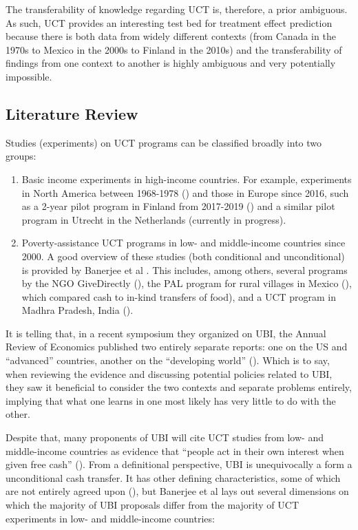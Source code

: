 \documentclass[a4paper,12pt]{article}
\begin{document}
The transferability of knowledge regarding UCT is, therefore, a prior ambiguous. As such, UCT provides an interesting test bed for treatment effect prediction because there is both data from widely different contexts (from Canada in the 1970s to Mexico in the 2000s to Finland in the 2010s) and the transferability of findings from one context to another is highly ambiguous and very potentially impossible.

\subsection{ Literature Review }

Studies (experiments) on UCT programs can be classified broadly into two groups:

\begin{enumerate}
\item Basic income experiments in high-income countries. For example, experiments in North America between 1968-1978 (\cite{Forget2011}) and those in Europe since 2016, such as a 2-year pilot program in Finland from 2017-2019 (\cite{Kangas2019}) and a similar pilot program in Utrecht in the Netherlands (currently in progress).

\item Poverty-assistance UCT programs in low- and middle-income countries since 2000. A good overview of these studies (both conditional and unconditional) is provided by Banerjee et al \parencite*{Banerjee2017}. This includes, among others, several programs by the NGO GiveDirectly (\cite{Blattman2016}), the PAL program for rural villages in Mexico (\cite{Cunha2019}), which compared cash to in-kind transfers of food), and a UCT program in Madhra Pradesh, India (\cite{bharat2014little}).

\end{enumerate}

It is telling that, in a recent symposium they organized on UBI, the Annual Review of Economics published two entirely separate reports: one on the US and ``advanced'' countries, another on the ``developing world'' (\cite{Hoynes2019, Banerjee2019}). Which is to say, when reviewing the evidence and discussing potential policies related to UBI, they saw it beneficial to consider the two contexts and separate problems entirely, implying that what one learns in one most likely has very little to do with the other.

Despite that, many proponents of UBI will cite UCT studies from low- and middle-income countries as evidence that ``people act in their own interest when given free cash'' (\cite{van2017basic}). From a definitional perspective, UBI is unequivocally a form a unconditional cash transfer. It has other defining characteristics, some of which are not entirely agreed upon (\cite{Hoynes2019}), but Banerjee et al \parencite*{Banerjee2019} lays out several dimensions on which the majority of UBI proposals differ from the majority of UCT experiments in low- and middle-income countries: 
\end{document}
